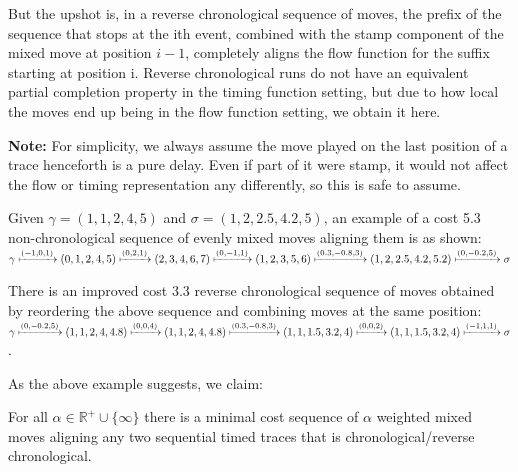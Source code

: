 \documentclass[runningheads]{llncs}
\begin{document}
    But the upshot is, in a reverse chronological sequence of moves, the prefix of the sequence that stops at the ith event, combined with the stamp component of the mixed move at position $i-1$, completely aligns the flow function for the suffix starting at position i. 
    Reverse chronological runs do not have an equivalent partial completion property in the timing function setting, but due to how local the moves end up being in the flow function setting, we obtain it here. 
    
    \textbf{Note: } For simplicity, we always assume the move played on the last position of a trace henceforth is a pure delay. Even if part of it were stamp, it would not affect the flow or timing representation any differently, so this is safe to assume. 
    
    \begin{example}
        
        Given $\gamma = (1, 1, 2, 4, 5)$ and $\sigma = (1, 2, 2.5, 4.2, 5)$, an example of a cost 5.3 non-chronological sequence of evenly mixed moves aligning them is as shown: 
         $\gamma \xmapsto{(-1, 0, 1)} (0, 1, 2, 4, 5) \xmapsto{(0, 2, 1)} (2, 3, 4, 6, 7) \xmapsto{(0, -1, 1)} (1, 2, 3, 5, 6) \xmapsto{(0.3, -0.8, 3)} (1, 2, 2.5, 4.2, 5.2) \xmapsto{(0, -0.2, 5)} \sigma$

        There is an improved cost 3.3 reverse chronological sequence of moves obtained by reordering the above sequence and combining moves at the same position: $\gamma \xmapsto{(0, -0.2, 5)} (1, 1, 2, 4, 4.8) \xmapsto{(0, 0, 4)} (1, 1, 2, 4, 4.8) \xmapsto{(0.3, -0.8, 3)}(1, 1, 1.5, 3.2, 4)\xmapsto{(0, 0, 2)} (1, 1, 1.5, 3.2, 4)\xmapsto{(-1, 1, 1)} \sigma $. 
        
    \end{example}
    
    As the above example suggests, we claim: 
    
    \begin{lemma}\label{linescommute} For all $\alpha \in \mathbb{R}^+ \cup \{\infty\}$ there is a minimal cost sequence of $\alpha$ weighted mixed moves aligning any two sequential timed traces that is chronological/reverse chronological. 
    \end{lemma}
\end{document}
